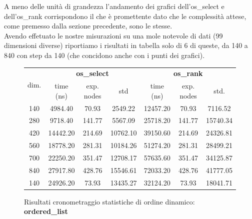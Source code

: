 \documentclass{article}
\begin{document}
\noindent A meno delle unità di grandezza l'andamento dei grafici dell'os\_select e dell'os\_rank corrispondono il che è promettente dato che le complessità attese, come premesso dalla sezione precedente, sono le stesse.\\

\noindent Avendo effetuato le nostre misurazioni su una mole notevole di dati (99 dimensioni diverse) riportiamo i risultati in tabella solo di 6 di queste, da 140 a 840 con step da 140 (che concidono anche con i punti dei grafici). 

\begin{figure}[h]
    \caption{Risultati cronometraggio statistiche di ordine dinamico: \textbf{ordered\_list}}
        \begin{tabularx}{\textwidth}{ccccccc}
            \toprule
            \multirow{2}{*}{dim.} & \multicolumn{3}{c}{\textbf{os\_select}} & \multicolumn{3}{c}{\textbf{os\_rank}} \\
            \cmidrule(lr){2-4} \cmidrule(lr){5-7}
            & time (ns) & exp. nodes & std & time (ns) & exp. nodes & std. \\
            \midrule
140 & 4984.40 & 70.93 & 2549.22 & 12457.20 & 70.93 & 7116.52 \\
280 & 9718.40 & 141.77 & 5567.09 & 25718.20 & 141.77 & 15740.34 \\
420 & 14442.20 & 214.69 & 10762.10 & 39150.60 & 214.69 & 24326.81 \\
560 & 18778.20 & 281.31 & 10184.26 & 51274.20 & 281.31 & 28499.21 \\
700 & 22250.20 & 351.47 & 12708.17 & 57635.60 & 351.47 & 34125.87 \\
840 & 27917.80 & 428.76 & 15546.61 & 72033.20 & 428.76 & 41777.05 \\
140 & 24926.20 & 73.93 & 13435.27 & 32124.20 & 73.93 & 18041.71 \\
            \bottomrule
        \end{tabularx}
\end{figure}
\end{document}
